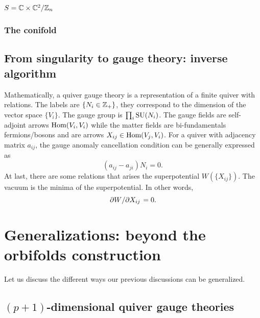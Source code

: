 \documentclass[a4paper,10pt]{article}
\begin{document}
        \subsubsection{$S=\mathbb{C}\times\mathbb{C}^2/\mathbb{Z}_n$}

        \subsubsection{The conifold}

    \subsection{From singularity to gauge theory: inverse algorithm}

        Mathematically, a quiver gauge theory is a representation of a finite quiver with relations. The labels are $\{N_i\in\mathbb{Z}_+\}$, they correspond to the dimension of the vector space $\{V_i\}$. The gauge group is $\prod_i\text{SU}(N_i)$. The gauge fields are self-adjoint arrows $\text{Hom}(V_i,V_i)$ while the matter fields are bi-fundamentals fermions/bosons and are arrows $X_{ij}\in\text{Hom}(V_j,V_i)$. For a quiver with adjacency matrix $a_{ij}$, the gauge anomaly cancellation condition can be generally expressed as
        \begin{equation}
            (a_{ij}-a_{ji})N_i=0.
        \end{equation}
        At last, there are some relations that arises the superpotential $W(\{X_{ij}\})$. The vacuum is the minima of the superpotential. In other words,
        \begin{equation}
            \pdv*{W}{X_{ij}}=0.
        \end{equation}

    
    

\section{Generalizations: beyond the orbifolds construction}

    Let us discuss the different ways our previous discussions can be generalized.

    \subsection{$(p+1)$-dimensional quiver gauge theories}
\end{document}
